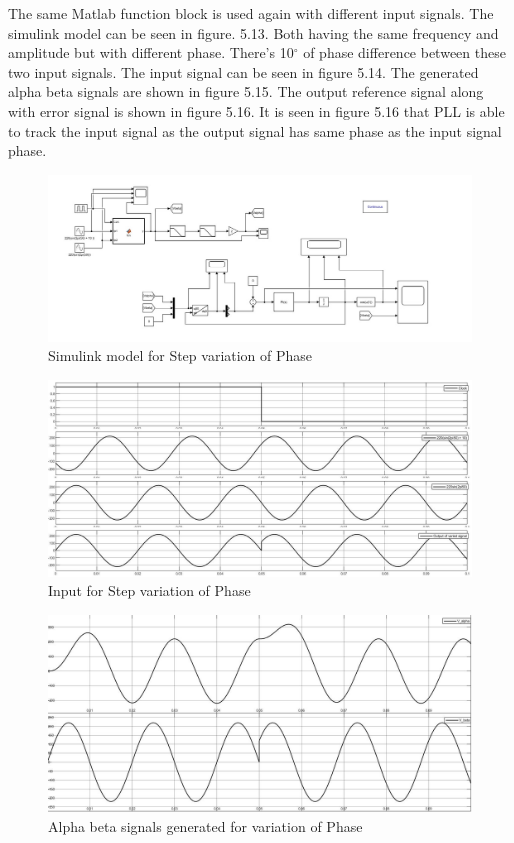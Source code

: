 \documentclass[a4paper,12pt]{iitmdiss}
\begin{document}
The same Matlab function block is used again with different input signals. The simulink model can be seen in figure. 5.13.
Both having the same frequency and amplitude but with different phase. There's 10$^{\circ}$ of phase difference between these two input signals. The input signal can be seen in figure 5.14. The generated alpha beta signals are shown in figure 5.15. The output reference signal along with error signal is shown in figure 5.16. It is seen in figure 5.16 that PLL is able to track the input signal as the output signal has same phase as the input signal phase.
\begin{figure}[hbt!]
    \centering
    \includegraphics[width=1.0\textwidth]{Step variation of phase.jpg}
    \caption{Simulink model for Step variation of Phase}
\end{figure}



\begin{figure}[hbt!]
    \centering
    \includegraphics[width=1.0\textwidth]{input_phase.jpg}
    \caption{Input for Step variation of Phase}
\end{figure}



\begin{figure}[hbt!]
    \centering
    \includegraphics[width=1.0\textwidth]{alphaBeta_Phase.jpg}
    \caption{Alpha beta signals generated for variation of Phase}
\end{figure}
\end{document}
